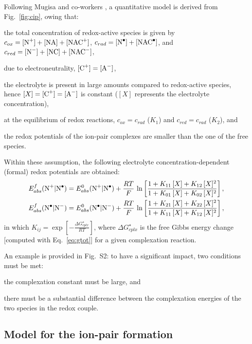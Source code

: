 \documentclass[review,preprint]{elsarticle}
\begin{document}
Following Mugisa and co-workers \cite{mugisaEffectIonparingKinetics2024}, a quantitative model is derived from Fig.~\ref{fig:cip}, owing that: \begin{inparaenum}[(i)]
	\item the total concentration of redox-active species is given by $c_{ox} = [\ce{N+}] + [\ce{NA}] + [\ce{NAC+}]$, $c_{rad} = [\ce{N^.}] + [\ce{NAC^.}]$, and $c_{red} =  [\ce{N-}] + [\ce{NC}] + [\ce{NAC-}]$,
	\item due to electroneutrality, $ [\ce{C+}] = [\ce{A-}] $,
	\item the electrolyte is present in large amounts compared to redox-active species, hence $[X] = [\ce{C+}] = [\ce{A-}] $ is constant ($[X]$ represents the electrolyte concentration),
	\item at the equilibrium of redox reactions, $c_{ox} = c_{rad}$ ($K_1$) and $c_{red} = c_{rad}$ ($K_2$), and
	\item the redox potentials of the ion-pair complexes are smaller than the one of the free species.
\end{inparaenum}
Within these assumption, the following electrolyte concentration-dependent (formal) redox potentials are obtained:\begin{align}
	E^f_{abs}(\ce{N+|N^.}) &= E^0_ {abs}(\ce{N+|N^.})+\frac{RT}{F}\,\ln\left[\frac{1+K_{11}\,[X]+K_{12}\,[X]^2}{1+K_{01}\,[X]+K_{02}\,[X]^2}\right],\\
	E^f_{abs}(\ce{N^.|N-}) &= E^0_ {abs}(\ce{N^.|N-})+\frac{RT}{F}\,\ln\left[\frac{1+K_{21}\,[X]+K_{22}\,[X]^2}{1+K_{11}\,[X]+K_{12}\,[X]^2}\right],
\end{align}
in which $K_{ij}= \exp\left[-\frac{\Delta G_{cplx}^\star}{RT}\right]$, where $\Delta G_{cplx}^\star$ is the free Gibbs energy change [computed with Eq.~\eqref{eq:gtot}] for a given complexation reaction.

An example is provided in Fig.~S2: to have a significant impact, two conditions must be met: \begin{inparaenum}[(i)]
	\item the complexation constant must be large, and
	\item there must be a substantial difference between the complexation energies of the two species in the redox couple.
\end{inparaenum}

\subsection{Model for the ion-pair formation}
\end{document}
